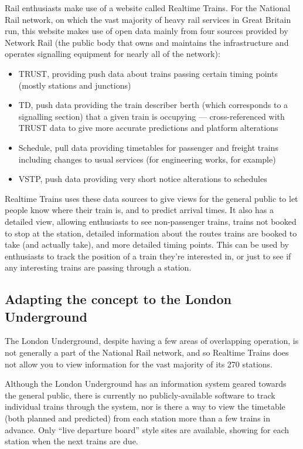 \documentclass[a4paper,12pt]{article}
\begin{document}
Rail enthusiasts make use of a website called Realtime Trains. For the National
Rail network, on which the vast majority of heavy rail services in Great
Britain run, this website makes use of open data mainly from four sources
provided by Network Rail (the public body that owns and maintains the
infrastructure and operates signalling equipment for nearly all of the
network)\cite{RTTData}:

\begin{itemize}
  \item TRUST, providing push data about trains passing certain timing points
    (mostly stations and junctions)
  \item TD, push data providing the train describer berth (which corresponds to
    a signalling section) that a given train is occupying --- cross-referenced
    with TRUST data to give more accurate predictions and platform alterations
  \item Schedule, pull data providing timetables for passenger and freight
    trains including changes to usual services (for engineering works, for
    example)
  \item VSTP, push data providing very short notice alterations to schedules
\end{itemize}

Realtime Trains uses these data sources to give views for the general public to
let people know where their train is, and to predict arrival times. It also has
a detailed view, allowing enthusiasts to see non-passenger trains, trains not
booked to stop at the station, detailed information about the routes trains are
booked to take (and actually take), and more detailed timing points. This can
be used by enthusiasts to track the position of a train they're interested in,
or just to see if any interesting trains are passing through a station.

\subsection{Adapting the concept to the London Underground}

The London Underground, despite having a few areas of overlapping operation, is
not generally a part of the National Rail network, and so Realtime Trains does
not allow you to view information for the vast majority of its 270 stations.

Although the London Underground has an information system geared towards the
general public, there is currently no publicly-available software to track
individual trains through the system, nor is there a way to view the timetable
(both planned and predicted) from each station more than a few trains in
advance. Only ``live departure board'' style sites are available, showing for
each station when the next trains are due.
\end{document}

